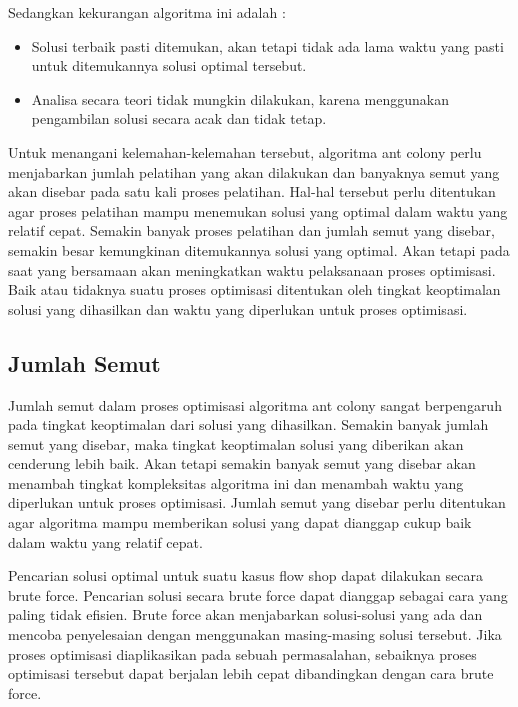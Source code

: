 	Sedangkan kekurangan algoritma ini adalah :
	\begin{itemize}
		\item Solusi terbaik pasti ditemukan, akan tetapi tidak ada lama waktu yang pasti untuk ditemukannya
		solusi optimal tersebut.
		\item Analisa secara teori tidak mungkin dilakukan, karena menggunakan pengambilan solusi secara
		acak dan tidak tetap.
	\end{itemize}

	Untuk menangani kelemahan-kelemahan tersebut, algoritma ant colony perlu menjabarkan jumlah
	pelatihan yang akan dilakukan dan banyaknya semut yang akan disebar pada satu kali proses
	pelatihan. Hal-hal tersebut perlu ditentukan agar proses pelatihan mampu menemukan solusi yang
	optimal dalam waktu yang relatif cepat. Semakin banyak proses pelatihan dan jumlah semut yang
	disebar, semakin besar kemungkinan ditemukannya solusi yang optimal. Akan tetapi pada saat
	yang bersamaan akan meningkatkan waktu pelaksanaan proses optimisasi. Baik atau tidaknya suatu
	proses optimisasi ditentukan oleh tingkat keoptimalan solusi yang dihasilkan dan waktu yang
	diperlukan untuk proses optimisasi.
	
	\subsection{Jumlah Semut}
	
	Jumlah semut dalam proses optimisasi algoritma ant colony sangat berpengaruh pada tingkat keoptimalan
	dari solusi yang dihasilkan. Semakin banyak jumlah semut yang disebar, maka tingkat
	keoptimalan solusi yang diberikan akan cenderung lebih baik. Akan tetapi semakin banyak semut
	yang disebar akan menambah tingkat kompleksitas algoritma ini dan menambah waktu yang diperlukan
	untuk proses optimisasi. Jumlah semut yang disebar perlu ditentukan agar algoritma mampu
	memberikan solusi yang dapat dianggap cukup baik dalam waktu yang relatif cepat.
	
	Pencarian solusi optimal untuk suatu kasus flow shop dapat dilakukan secara brute force.
	Pencarian solusi secara brute force dapat dianggap sebagai cara yang paling tidak efisien. Brute
	force akan menjabarkan solusi-solusi yang ada dan mencoba penyelesaian dengan menggunakan
	masing-masing solusi tersebut. Jika proses optimisasi diaplikasikan pada sebuah permasalahan,
	sebaiknya proses optimisasi tersebut dapat berjalan lebih cepat dibandingkan dengan cara brute
	force.
	
